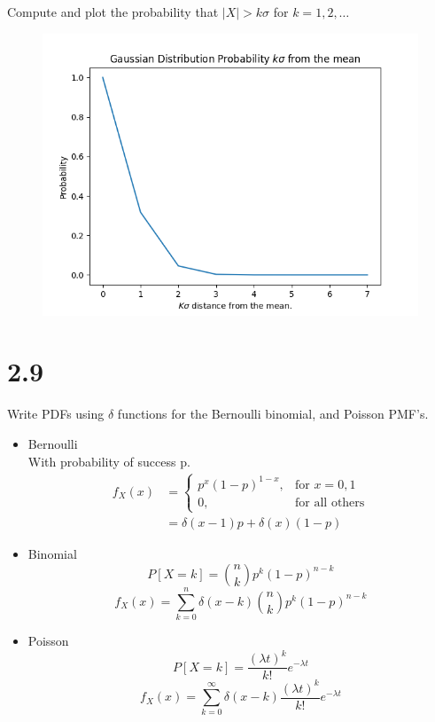 \documentclass[12pt]{article}
\newcommand{\mysection}[1]{\section*{#1}}
\begin{document}
Compute and plot the probability that $|X|>k\sigma$ for $k=1,2,\ldots$
\begin{figure}\centering
  \includegraphics[scale=0.7]{plot_gaussian_ksigma}
\end{figure}
\newpage




\mysection{2.9}
Write PDFs using $\delta$ functions for the Bernoulli binomial, and Poisson PMF's.
\begin{itemize}
  \item Bernoulli \\
    With probability of success p.
    \begin{align*}
      f_X(x)&=
      \begin{cases}
        p^x{(1-p)}^{1-x},  & \text{for } x=0, 1 \\
        0, & \text{for all others}
      \end{cases}\\
      &=\delta(x-1)p+\delta(x)(1-p)
    \end{align*}

  \item Binomial \\
    \[ P[X=k]=\binom{n}{k}p^k{(1-p)}^{n-k} \]
    \[ f_X(x)=\sum_{k=0}^n \delta(x-k) \binom{n}{k}p^k{(1-p)}^{n-k} \]
    
  \item Poisson \\
    \[ P[X=k]=\frac{{(\lambda t)}^k}{k!}e^{-\lambda t} \]
    \[ f_X(x)=\sum_{k=0}^\infty \delta(x-k) \frac{{(\lambda t)}^k}{k!}e^{-\lambda t} \]
\end{itemize}
\newpage
\end{document}
